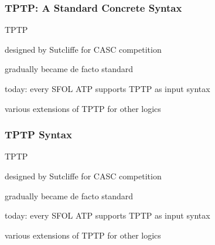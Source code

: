 \begin{frame}\frametitle{TPTP: A Standard Concrete Syntax}
\begin{blockitems}{TPTP}
\item designed by Sutcliffe for CASC competition
\item gradually became de facto standard
\item today: every SFOL ATP supports TPTP as input syntax
\item various extensions of TPTP for other logics
\end{blockitems}

\end{frame}

\begin{frame}\frametitle{TPTP Syntax}
\begin{blockitems}{TPTP}
\item designed by Sutcliffe for CASC competition
\item gradually became de facto standard
\item today: every SFOL ATP supports TPTP as input syntax
\item various extensions of TPTP for other logics
\end{blockitems}

\end{frame}

